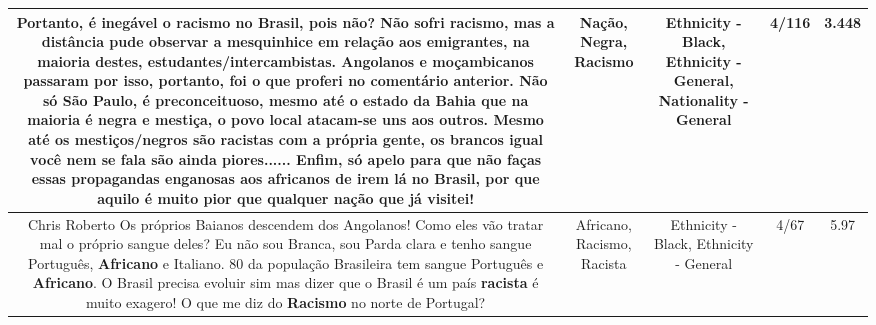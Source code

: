 \documentclass[11pt]{article}
\newlength\mylength
\begin{document}
\begin{center}
\begin{longtable}{|C{.65\mylength}|C{.30\mylength}|C{.12\mylength}|C{.12\mylength}|C{.12\mylength}|}
  \small Portanto, é inegável o \textbf{racismo} no Brasil, pois não? Não sofri \textbf{racismo}, mas a distância pude observar a mesquinhice em relação aos emigrantes, na maioria destes, estudantes/intercambistas. Angolanos e moçambicanos passaram por isso, portanto,  foi o que proferi no comentário anterior.  Não só São Paulo, é preconceituoso, mesmo até o estado da Bahia que na maioria é \textbf{negra} e mestiça, o povo local atacam-se uns aos outros. Mesmo até os mestiços/negros são racistas com a própria gente, os brancos igual você nem se fala são ainda piores...... Enfim, só apelo para que não faças essas propagandas enganosas aos africanos de irem lá no Brasil, por que aquilo é muito pior que qualquer \textbf{nação} que já visitei!\normalsize   & Nação, Negra, Racismo & Ethnicity - Black, Ethnicity - General, Nationality - General & 4/116 & 3.448 \\  \hline
  \small Chris Roberto Os próprios Baianos descendem dos Angolanos! Como eles vão tratar mal o próprio sangue deles? Eu não sou Branca, sou Parda clara e tenho sangue Português, \textbf{Africano} e Italiano. 80 da população Brasileira tem sangue Português e \textbf{Africano}. O Brasil precisa evoluir sim mas dizer que o Brasil é um país \textbf{racista} é muito exagero! O que me diz do \textbf{Racismo} no norte de Portugal?\normalsize   & Africano, Racismo, Racista & Ethnicity - Black, Ethnicity - General & 4/67 & 5.97 \\  \hline

\end{longtable}
\end{center}
\end{document}
